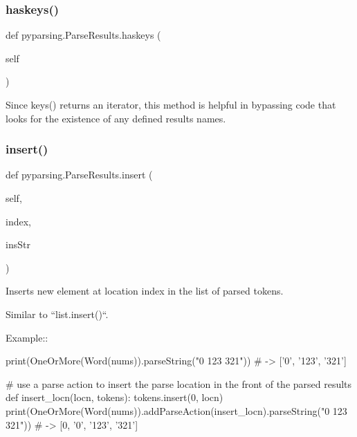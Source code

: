 \subsubsection{\texorpdfstring{haskeys()}{haskeys()}}
{\footnotesize\ttfamily def pyparsing.\+Parse\+Results.\+haskeys (\begin{DoxyParamCaption}\item[{}]{self }\end{DoxyParamCaption})}

\begin{DoxyVerb}Since keys() returns an iterator, this method is helpful in bypassing
   code that looks for the existence of any defined results names.\end{DoxyVerb}
 \mbox{\label{classpyparsing_1_1ParseResults_a1395e40484eaaf9a3c29de216d414833}} 
\subsubsection{\texorpdfstring{insert()}{insert()}}
{\footnotesize\ttfamily def pyparsing.\+Parse\+Results.\+insert (\begin{DoxyParamCaption}\item[{}]{self,  }\item[{}]{index,  }\item[{}]{ins\+Str }\end{DoxyParamCaption})}

\begin{DoxyVerb}Inserts new element at location index in the list of parsed tokens.

Similar to ``list.insert()``.

Example::

    print(OneOrMore(Word(nums)).parseString("0 123 321")) # -> ['0', '123', '321']

    # use a parse action to insert the parse location in the front of the parsed results
    def insert_locn(locn, tokens):
tokens.insert(0, locn)
    print(OneOrMore(Word(nums)).addParseAction(insert_locn).parseString("0 123 321")) # -> [0, '0', '123', '321']
\end{DoxyVerb}
 \mbox{\label{classpyparsing_1_1ParseResults_a3b3a33f4261e2e499bf991288d77b050}} 
